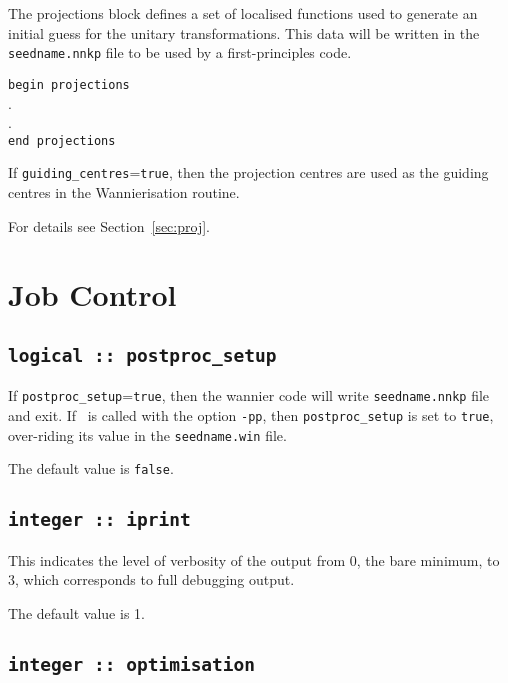  The projections block defines a set of localised functions used to
 generate an initial guess for the unitary transformations. 
This data will be written in the {\tt seedname.nnkp} file to be used
by a first-principles code.

\noindent \verb#begin projections# \\ 
  . \\ 
  . \\ 
\verb#end projections#

If \verb#guiding_centres#={\tt true}, then the projection centres are
used as the guiding centres in the Wannierisation routine.

For details see Section~\ref{sec:proj}.

\section{Job Control}

\subsection[postproc\_setup]{\tt logical :: postproc\_setup}
If \verb#postproc_setup#=\verb#true#, then the wannier code will write 
 {\tt seedname.nnkp} file and exit.
If \wannier\ is called with the option {\tt -pp}, then 
 \verb#postproc_setup# is set to 
\verb#true#, over-riding its
value in the {\tt seedname.win} file.

The default value is \verb#false#.


%


\subsection[iprint]{\tt integer :: iprint}

This indicates the level of verbosity of the output from 0,
the bare minimum, to 3, which corresponds to full debugging output.

The default value is 1.

\subsection[optimisation]{\tt integer :: optimisation}


